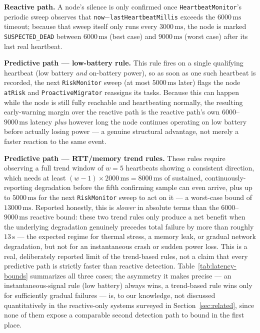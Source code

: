 \documentclass[conference]{IEEEtran}
\begin{document}
\textbf{Reactive path.} A node's silence is only confirmed once \texttt{HeartbeatMonitor}'s periodic
sweep observes that \texttt{now}$-$\texttt{lastHeartbeatMillis} exceeds the $6000\,\mathrm{ms}$
timeout; because that sweep itself only runs every $3000\,\mathrm{ms}$, the node is marked
\texttt{SUSPECTED\_DEAD} between $6000\,\mathrm{ms}$ (best case) and $9000\,\mathrm{ms}$ (worst case)
after its last real heartbeat.

\textbf{Predictive path — low-battery rule.} This rule fires on a single qualifying heartbeat (low
battery \emph{and} on-battery power), so as soon as one such heartbeat is recorded, the next
\texttt{RiskMonitor} sweep (at most $5000\,\mathrm{ms}$ later) flags the node \texttt{atRisk} and
\texttt{ProactiveMigrator} reassigns its tasks. Because this can happen while the node is still fully
reachable and heartbeating normally, the resulting early-warning margin over the reactive path is the
reactive path's own $6000$--$9000\,\mathrm{ms}$ latency \emph{plus} however long the node continues
operating on low battery before actually losing power — a genuine structural advantage, not merely a
faster reaction to the same event.

\textbf{Predictive path — RTT/memory trend rules.} These rules require observing a full trend window
of $w=5$ heartbeats showing a consistent direction, which needs at least $(w-1)\times
2000\,\mathrm{ms}=8000\,\mathrm{ms}$ of sustained, continuously-reporting degradation before the fifth
confirming sample can even arrive, plus up to $5000\,\mathrm{ms}$ for the next \texttt{RiskMonitor}
sweep to act on it — a worst-case bound of $13000\,\mathrm{ms}$. Reported honestly, this is
\emph{slower} in absolute terms than the $6000$--$9000\,\mathrm{ms}$ reactive bound: these two trend
rules only produce a net benefit when the underlying degradation genuinely precedes total failure by
more than roughly $13\,\mathrm{s}$ — the expected regime for thermal stress, a memory leak, or
gradual network degradation, but not for an instantaneous crash or sudden power loss. This is a
real, deliberately reported limit of the trend-based rules, not a claim that every predictive path is
strictly faster than reactive detection. Table~\ref{tab:latency-bounds} summarizes all three cases;
the asymmetry it makes precise — an instantaneous-signal rule (low battery) always wins, a
trend-based rule wins only for sufficiently gradual failures — is, to our knowledge, not discussed
quantitatively in the reactive-only systems surveyed in Section~\ref{sec:related}, since none of them
expose a comparable second detection path to bound in the first place.
\end{document}
